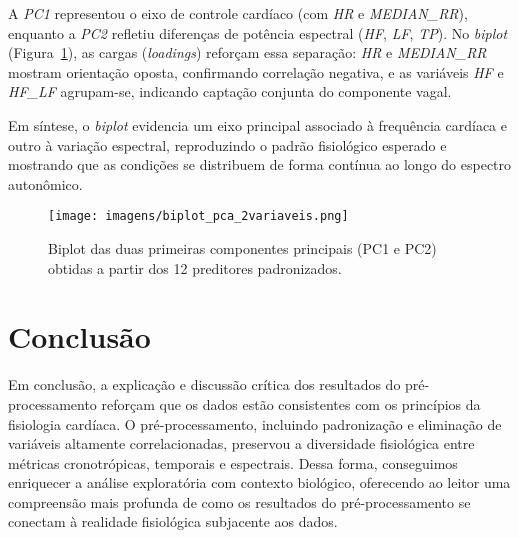 \documentclass[conference]{IEEEtran}
\begin{document}
A \textit{PC1} representou o eixo de controle cardíaco (com \textit{HR} e \textit{MEDIAN\_RR}), enquanto a \textit{PC2} refletiu diferenças de potência espectral (\textit{HF}, \textit{LF}, \textit{TP}). 
No \textit{biplot} (Figura~\ref{fig:biplot_pca}), as cargas (\textit{loadings}) reforçam essa separação: \textit{HR} e \textit{MEDIAN\_RR} mostram orientação oposta, confirmando correlação negativa, e as variáveis \textit{HF} e \textit{HF\_LF} agrupam-se, indicando captação conjunta do componente vagal.  

Em síntese, o \textit{biplot} evidencia um eixo principal associado à frequência cardíaca e outro à variação espectral, reproduzindo o padrão fisiológico esperado e mostrando que as condições se distribuem de forma contínua ao longo do espectro autonômico.

\begin{figure}[H]
    \centering
    \texttt{[image: imagens/biplot\_pca\_2variaveis.png]}
    \caption{Biplot das duas primeiras componentes principais (PC1 e PC2) obtidas a partir dos 12 preditores padronizados.}
    \label{fig:biplot_pca}
\end{figure}


\section{Conclusão}

Em conclusão, a explicação e discussão crítica dos resultados do pré-processamento reforçam que os dados estão consistentes com os princípios da fisiologia cardíaca. O pré-processamento, incluindo padronização e eliminação de variáveis altamente correlacionadas, preservou a diversidade fisiológica entre métricas cronotrópicas, temporais e espectrais. Dessa forma, conseguimos enriquecer a análise exploratória com contexto biológico, oferecendo ao leitor uma compreensão mais profunda de como os resultados do pré-processamento se conectam à realidade fisiológica subjacente aos dados.
\end{document}

